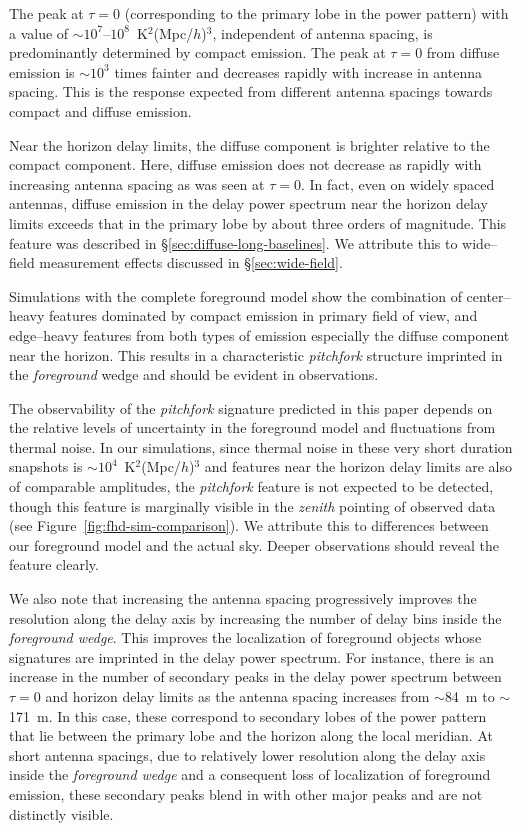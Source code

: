 \documentclass[preprint2,iop,numberedappendix,twocolappendix,appendixfloats]{emulateapj}
\begin{document}
The peak at $\tau=0$ (corresponding to the primary lobe in the power pattern) with a value of $\sim 10^7$--$10^8$~K$^2$(Mpc/$h$)$^3$, independent of antenna spacing, is predominantly determined by compact emission. The peak at $\tau=0$ from diffuse emission is $\sim 10^3$ times fainter and decreases rapidly with increase in antenna spacing. This is the response expected from different antenna spacings towards compact and diffuse emission. 

Near the horizon delay limits, the diffuse component is brighter relative to the compact component. Here, diffuse emission does not decrease as rapidly with increasing antenna spacing as was seen at $\tau=0$. In fact, even on widely spaced antennas, diffuse emission in the delay power spectrum near the horizon delay limits exceeds that in the primary lobe by about three orders of magnitude. This feature was described in \S\ref{sec:diffuse-long-baselines}. We attribute this to wide--field measurement effects discussed in \S\ref{sec:wide-field}. 

Simulations with the complete foreground model show the combination of center--heavy features dominated by compact emission in primary field of view, and edge--heavy features from both types of emission especially the diffuse component near the horizon. This results in a characteristic {\it pitchfork} structure imprinted in the {\it foreground} wedge and should be evident in observations.

The observability of the {\it pitchfork} signature predicted in this paper depends on the relative levels of uncertainty in the foreground model and fluctuations from thermal noise. In our simulations, since thermal noise in these very short duration snapshots is $\sim 10^4$~K$^2$(Mpc/$h$)$^3$ and features near the horizon delay limits are also of comparable amplitudes, the {\it pitchfork} feature is not expected to be detected, though this feature is marginally visible in the {\it zenith} pointing of observed data (see Figure~\ref{fig:fhd-sim-comparison}). We attribute this to differences between our foreground model and the actual sky.  Deeper observations should reveal the feature clearly.

We also note that increasing the antenna spacing progressively improves the resolution along the delay axis by increasing the number of delay bins inside the {\it foreground wedge}. This improves the localization of foreground objects whose signatures are imprinted in the delay power spectrum. For instance, there is an increase in the number of secondary peaks in the delay power spectrum between $\tau=0$ and horizon delay limits as the antenna spacing increases from $\sim$84~m to $\sim$171~m. In this case, these correspond to secondary lobes of the power pattern that lie between the primary lobe and the horizon along the local meridian. At short antenna spacings, due to relatively lower resolution along the delay axis inside the {\it foreground wedge} and a consequent loss of localization of foreground emission, these secondary peaks blend in with other major peaks and are not distinctly visible. 
\end{document}
